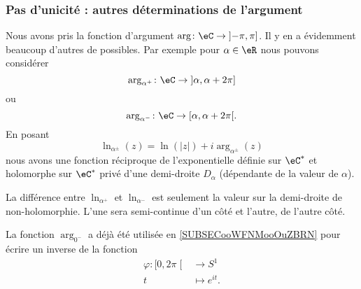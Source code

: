 \subsubsection{Pas d'unicité : autres déterminations de l'argument}

\begin{normaltext}      \label{NORMooFCDOooFDzAjp}
    Nous avons pris la fonction d'argument \( \arg\colon \eC\to \mathopen] -\pi , \pi \mathclose]\). Il y en a évidemment beaucoup d'autres de possibles. Par exemple pour \( \alpha\in \eR\) nous pouvons considérer
    \begin{equation}        \label{EQooNKKDooOuJxXe}
        \arg_{\alpha^+}\colon \eC\to \mathopen] \alpha , \alpha+2\pi \mathclose]
    \end{equation}
    ou
    \begin{equation}
        \arg_{\alpha^-}\colon \eC\to \mathopen[ \alpha , \alpha+2\pi \mathclose[.
    \end{equation}
    En posant
    \begin{equation}
        \ln_{\alpha^{\pm}}(z)=\ln(| z |)+i\arg_{\alpha^{\pm}}(z)
    \end{equation}
nous avons une fonction réciproque de l'exponentielle définie sur \( \eC^*\) et holomorphe sur \( \eC^*\) privé d'une demi-droite \( D_{\alpha}\) (dépendante de la valeur de \( \alpha\)).
\end{normaltext}

La différence entre \( \ln_{\alpha^+}\) et \( \ln_{\alpha^-}\) est seulement la valeur sur la demi-droite de non-holomorphie. L'une sera semi-continue d'un côté et l'autre, de l'autre côté.

\begin{remark}
    La fonction \( \arg_{0^-}\) a déjà été utilisée en \ref{SUBSECooWFNMooOuZBRN} pour écrire un inverse de la fonction
    \begin{equation}
        \begin{aligned}
            \varphi\colon \mathopen[ 0 , 2\pi \mathclose[  &\to S^1 \\
                t&\mapsto  e^{it}. 
        \end{aligned}
    \end{equation}
\end{remark}

